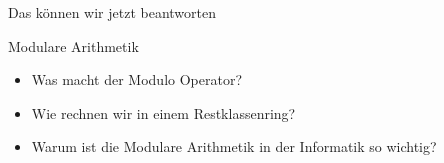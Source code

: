 \begin{frame}[fragile]{Das können wir jetzt beantworten}
	\begin{alertblock}{Modulare Arithmetik}
		\begin{itemize}
			\item Was macht der Modulo Operator?
			\item Wie rechnen wir in einem Restklassenring?
			\item Warum ist die Modulare Arithmetik in der Informatik so wichtig?
		\end{itemize}
	\end{alertblock}
\end{frame}